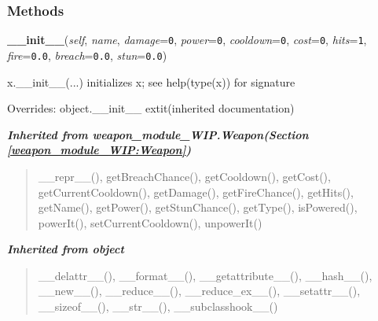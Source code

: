 
  \subsubsection{Methods}

    \vspace{0.5ex}

\hspace{.8\funcindent}\begin{boxedminipage}{\funcwidth}

    \raggedright \textbf{\_\_init\_\_}(\textit{self}, \textit{name}, \textit{damage}={\tt 0}, \textit{power}={\tt 0}, \textit{cooldown}={\tt 0}, \textit{cost}={\tt 0}, \textit{hits}={\tt 1}, \textit{fire}={\tt 0.0}, \textit{breach}={\tt 0.0}, \textit{stun}={\tt 0.0})

\setlength{\parskip}{2ex}
    x.\_\_init\_\_(...) initializes x; see help(type(x)) for signature

\setlength{\parskip}{1ex}
      Overrides: object.\_\_init\_\_ 	extit{(inherited documentation)}

    \end{boxedminipage}


\large{\textbf{\textit{Inherited from weapon\_module\_WIP.Weapon\textit{(Section \ref{weapon_module_WIP:Weapon})}}}}

\begin{quote}
\_\_repr\_\_(), getBreachChance(), getCooldown(), getCost(), getCurrentCooldown(), getDamage(), getFireChance(), getHits(), getName(), getPower(), getStunChance(), getType(), isPowered(), powerIt(), setCurrentCooldown(), unpowerIt()
\end{quote}

\large{\textbf{\textit{Inherited from object}}}

\begin{quote}
\_\_delattr\_\_(), \_\_format\_\_(), \_\_getattribute\_\_(), \_\_hash\_\_(), \_\_new\_\_(), \_\_reduce\_\_(), \_\_reduce\_ex\_\_(), \_\_setattr\_\_(), \_\_sizeof\_\_(), \_\_str\_\_(), \_\_subclasshook\_\_()
\end{quote}


